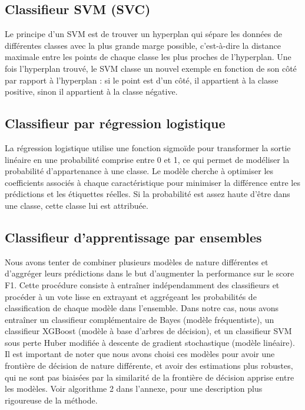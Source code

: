 \documentclass{article}
\begin{document}
\subsection{Classifieur SVM (SVC)}
Le principe d'un SVM est de trouver un hyperplan qui sépare les données de différentes classes avec la plus grande marge possible, c'est-à-dire la distance maximale entre les points de chaque classe les plus proches de l'hyperplan. Une fois l'hyperplan trouvé, le SVM classe un nouvel exemple en fonction de son côté par rapport à l'hyperplan : si le point est d’un côté, il appartient à la classe positive, sinon il appartient à la classe négative.

\subsection{Classifieur par régression logistique}
La régression logistique utilise une fonction sigmoïde pour transformer la sortie linéaire en une probabilité comprise entre 0 et 1, ce qui permet de modéliser la probabilité d'appartenance à une classe. Le modèle cherche à optimiser les coefficients associés à chaque caractéristique pour minimiser la différence entre les prédictions et les étiquettes réelles. Si la probabilité est assez haute d'être dans une classe, cette classe lui est attribuée.

\subsection{Classifieur d'apprentissage par ensembles}
Nous avons tenter de combiner plusieurs modèles de nature différentes et d'aggréger leurs prédictions dans le but d'augmenter la performance sur le score F1. Cette procédure consiste à entraîner indépendamment des classifieurs et procéder à un vote lisse en extrayant et aggrégeant les probabilités de classification de chaque modèle dans l'ensemble. Dans notre cas, nous avons entraîner un classifieur complémentaire de Bayes (modèle fréquentiste), un classifieur XGBoost (modèle à base d'arbres de décision), et un classifieur SVM sous perte Huber modifiée à descente de gradient stochastique (modèle linéaire). Il est important de noter que nous avons choisi ces modèles pour avoir une frontière de décision de nature différente, et avoir des estimations plus robustes, qui ne sont pas biaisées par la similarité de la frontière de décision apprise entre les modèles. Voir algorithme 2 dans l'annexe, pour une description plus rigoureuse de la méthode.
\end{document}
